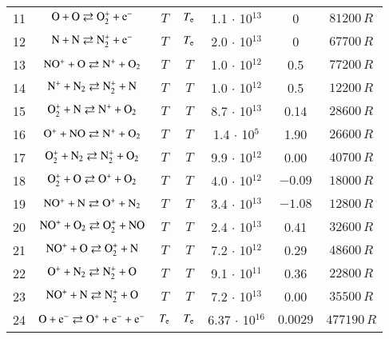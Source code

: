 \documentclass{warpdoc}
\begin{document}
\begin{table}[t]
\begin{center}
\begin{threeparttable}
\begin{tabular}{ccccccc}
11 & $\rm O + O \rightleftarrows O_2^+ + e^- $ & $T$ & $T_{\rm e}$ & 1.1 $\cdot$ 10$^{13}$  & 0 & $81200 \, R$ \\

12 & $\rm N + N \rightleftarrows N_2^+ + e^- $ & $T$ & $T_{\rm e}$ & 2.0 $\cdot$ 10$^{13}$  & 0 & $67700 \, R$ \\

13 & $\rm NO^+ + O \rightleftarrows N^+ + O_2 $ & $T$  & $T$ & 1.0 $\cdot$ 10$^{12}$  & 0.5 & $77200 \, R$ \\

14 & $\rm N^+ + N_2 \rightleftarrows N_2^+ + N $ & $T$  & $T$ & 1.0 $\cdot$ 10$^{12}$  & 0.5 & $12200 \, R$ \\

15 & $\rm O_2^+ + N \rightleftarrows N^+ + O_2 $ & $T$ & $T$  & 8.7 $\cdot$ 10$^{13}$  & 0.14 & $28600 \, R$ \\

16 & $\rm O^+ + NO \rightleftarrows N^+ + O_2 $ & $T$ & $T$  & 1.4 $\cdot$ 10$^{5}$  & 1.90 & $26600 \, R$ \\

17 & $\rm O_2^+ + N_2 \rightleftarrows N_2^+ + O_2 $ & $T$ & $T$  & 9.9 $\cdot$ 10$^{12}$  & 0.00 & $40700 \, R$ \\

18 & $\rm O_2^+ + O \rightleftarrows O^+ + O_2 $ & $T$ & $T$  & 4.0 $\cdot$ 10$^{12}$  & $-0.09$ & $18000 \, R$ \\

19 & $\rm NO^+ + N \rightleftarrows O^+ + N_2 $ & $T$ & $T$  & 3.4 $\cdot$ 10$^{13}$  & $-1.08$ & $12800 \, R$ \\

20 & $\rm NO^+ + O_2 \rightleftarrows O_2^+ + NO $ & $T$ & $T$  & 2.4 $\cdot$ 10$^{13}$  & 0.41 & $32600 \, R$ \\

21 & $\rm NO^+ + O \rightleftarrows O_2^+ + N $ & $T$ & $T$  & 7.2 $\cdot$ 10$^{12}$  & 0.29 & $48600 \, R$ \\

22 & $\rm O^+ + N_2 \rightleftarrows N_2^+ + O $ & $T$ & $T$ & 9.1 $\cdot$ 10$^{11}$  & 0.36 & $22800 \, R$ \\

23 & $\rm NO^+ + N \rightleftarrows N_2^+ + O $  & $T$ & $T$ & 7.2 $\cdot$ 10$^{13}$  & 0.00 & $35500 \, R$  \\


24 & $\rm O + e^- \rightleftarrows O^+ + e^- + e^- $ & $T_{\rm e}$  & $T_{\rm e}$ & 6.37 $\cdot$ 10$^{16}$  & $0.0029$ & $477190 \, R$  \\


\end{tabular}
\end{threeparttable}
\end{center}
\end{table}
\end{document}

